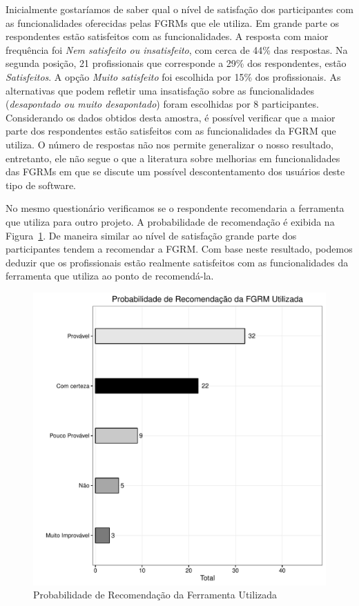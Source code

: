 Inicialmente gostaríamos de saber qual o nível de satisfação dos participantes
com as funcionalidades oferecidas pelas FGRMs que ele utiliza. Em grande parte
os respondentes estão satisfeitos com as funcionalidades. A resposta com maior
frequência foi \textit{Nem satisfeito ou insatisfeito}, com cerca de 44\% das
respostas. Na segunda posição, 21 profissionais que corresponde a 29\% dos
respondentes, estão \textit{Satisfeitos}. A opção \textit{Muito satisfeito} foi
escolhida por 15\% dos profissionais. As alternativas que podem refletir uma
insatisfação sobre as funcionalidades (\textit{desapontado ou muito
    desapontado}) foram escolhidas por 8 participantes. Considerando os dados
obtidos desta amostra, é possível verificar que a maior parte dos respondentes
estão satisfeitos com as funcionalidades da FGRM que utiliza. O número de
respostas não nos permite generalizar o nosso resultado, entretanto, ele não
segue o que a literatura sobre melhorias em funcionalidades das FGRMs em que se
discute um possível descontentamento dos usuários deste tipo de software.


No mesmo questionário verificamos se o respondente recomendaria a ferramenta que
utiliza para outro projeto. A probabilidade de recomendação é exibida na
Figura~\ref{fig:grafico_melhorias_fgrm_probabilidade_recomentacao}. De maneira
similar ao nível de satisfação grande parte dos participantes tendem a
recomendar a FGRM\@. Com base neste resultado, podemos deduzir que os
profissionais estão realmente satisfeitos com as funcionalidades da ferramenta
que utiliza ao ponto de recomendá-la.

\begin{figure}[htpb]
	\centering
	\includegraphics[width=0.5\linewidth]{./chapter-pesquisa-com-profissionais/img/grafico_melhorias_fgrm_probabilidade_recomentacao.pdf}
	\caption{Probabilidade de Recomendação da Ferramenta Utilizada}
\label{fig:grafico_melhorias_fgrm_probabilidade_recomentacao}
\end{figure}

